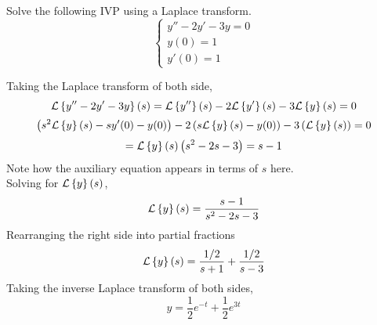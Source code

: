 \begin{example}
	Solve the following IVP using a Laplace transform.
	\begin{equation*}
		\begin{cases}
			y'' - 2y' - 3y = 0 \\
			y(0) = 1 \\
			y'(0) = 1
		\end{cases}
	\end{equation*}
\end{example}
\noindent
Taking the Laplace transform of both side,
\begin{equation*}
	\mathcal{L}\left\{ y'' - 2y' - 3y \right\}\left(s\right) = \mathcal{L}\left\{ y'' \right\}\left(s\right) - 2\mathcal{L}\left\{ y' \right\}\left(s\right) - 3\mathcal{L}\left\{ y \right\}\left(s\right) = 0
\end{equation*}
\begin{equation*}
	\left(s^2\mathcal{L}\left\{ y \right\}\left(s\right) - sy'(0) - y(0)\right) - 2\left(s\mathcal{L}\left\{ y \right\}\left(s\right) - y(0)\right) - 3\left(\mathcal{L}\left\{ y \right\}\left(s\right)\right) = 0
\end{equation*}
\begin{equation*}
	= \mathcal{L}\left\{ y \right\}\left(s\right)\left(s^2 - 2s - 3\right) = s - 1
\end{equation*}
Note how the auxiliary equation appears in terms of $s$ here.\\
Solving for $\mathcal{L}\left\{ y \right\}\left(s\right)$,
\begin{equation*}
	\mathcal{L}\left\{ y \right\}\left(s\right) = \frac{s - 1}{s^2 - 2s - 3}
\end{equation*}
Rearranging the right side into partial fractions
\begin{equation*}
	\mathcal{L}\left\{ y \right\}\left(s\right) = \frac{1/2}{s+1} + \frac{1/2}{s-3}
\end{equation*}
Taking the inverse Laplace transform of both sides,
\begin{equation*}
	y = \frac{1}{2}e^{-t} + \frac{1}{2}e^{3t}
\end{equation*}

